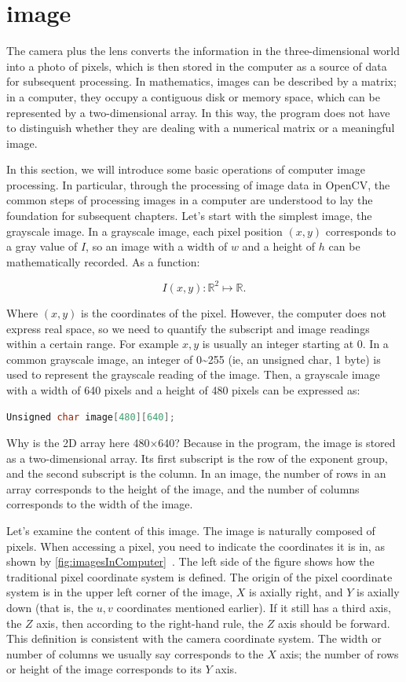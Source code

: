 \section{image}
The camera plus the lens converts the information in the three-dimensional world into a photo of pixels, which is then stored in the computer as a source of data for subsequent processing. In mathematics, images can be described by a matrix; in a computer, they occupy a contiguous disk or memory space, which can be represented by a two-dimensional array. In this way, the program does not have to distinguish whether they are dealing with a numerical matrix or a meaningful image.

In this section, we will introduce some basic operations of computer image processing. In particular, through the processing of image data in OpenCV, the common steps of processing images in a computer are understood to lay the foundation for subsequent chapters. Let's start with the simplest image, the grayscale image. In a grayscale image, each pixel position $(x, y)$ corresponds to a gray value of $I$, so an image with a width of $w$ and a height of $h$ can be mathematically recorded. As a function:

\[
{I} (x,y): \mathbb{R}^2 \mapsto \mathbb{R}.
\]

Where $(x,y)$ is the coordinates of the pixel. However, the computer does not express real space, so we need to quantify the subscript and image readings within a certain range. For example $x, y$ is usually an integer starting at 0. In a common grayscale image, an integer of 0\textasciitilde255 (ie, an unsigned char, 1 byte) is used to represent the grayscale reading of the image. Then, a grayscale image with a width of 640 pixels and a height of 480 pixels can be expressed as:

\begin{lstlisting}[language=C++, caption=two-dimensional array representation image]
Unsigned char image[480][640];
\end{lstlisting}

Why is the 2D array here 480$\times$640? Because in the program, the image is stored as a two-dimensional array. Its first subscript is the row of the exponent group, and the second subscript is the column. In an image, the number of rows in an array corresponds to the height of the image, and the number of columns corresponds to the width of the image.

Let's examine the content of this image. The image is naturally composed of pixels. When accessing a pixel, you need to indicate the coordinates it is in, as shown by \autoref{fig:imagesInComputer}~. The left side of the figure shows how the traditional pixel coordinate system is defined. The origin of the pixel coordinate system is in the upper left corner of the image, $X$ is axially right, and $Y$ is axially down (that is, the $u, v$ coordinates mentioned earlier). If it still has a third axis, the $Z$ axis, then according to the right-hand rule, the $Z$ axis should be forward. This definition is consistent with the camera coordinate system. The width or number of columns we usually say corresponds to the $X$ axis; the number of rows or height of the image corresponds to its $Y$ axis.

